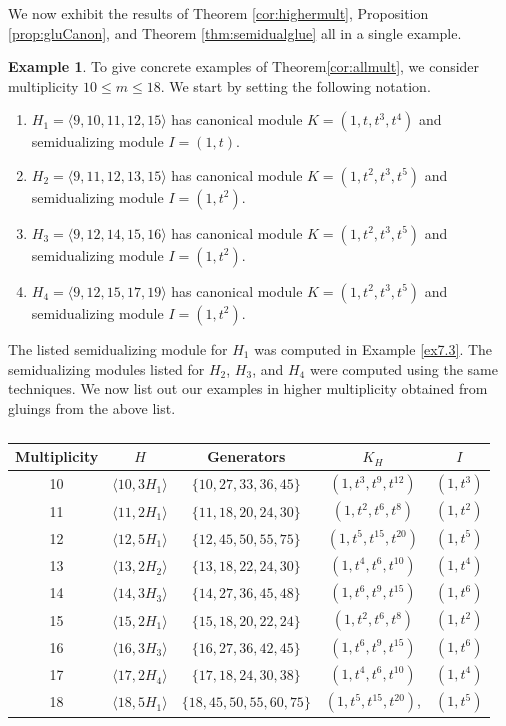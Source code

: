 \documentclass{amsart}
\theoremstyle{plain}
\theoremstyle{definition}
\newtheorem{example}[theorem]{Example}
\numberwithin{theorem}{section}
\numberwithin{equation}{section}
\numberwithin{equation}{theorem}
\begin{document}
We now exhibit the results of Theorem \ref{cor:highermult}, Proposition \ref{prop:gluCanon}, and Theorem \ref{thm:semidualglue} all in a single example.

\begin{example}\label{ex:highmult}
To give concrete examples of Theorem\ref{cor:allmult}, we consider multiplicity $10 \leq m \leq 18$. We start by setting the following notation.
	\begin{enumerate}
		\item $H_1 = \langle 9, 10, 11, 12, 15 \rangle$ has canonical module $K = (1, t, t^3, t^4)$ and semidualizing module $I = (1,t)$.
		\item  $H_2 = \langle 9, 11, 12, 13, 15 \rangle$ has canonical module $K = (1,t^2,t^3,t^5)$ and semidualizing module $I = (1,t^2)$.
		\item $H_3 = \langle 9, 12, 14, 15, 16 \rangle$ has canonical module $K = (1, t^2, t^3, t^5)$ and semidualizing module $I = (1, t^2)$.
		\item $H_4 = \langle 9, 12, 15, 17, 19 \rangle$ has canonical module $K = (1,t^2,t^3,t^5)$ and semidualizing module $I = (1,t^2)$.
	\end{enumerate}
The listed semidualizing module for $H_1$ was computed in Example \ref{ex7.3}. The semidualizing modules listed for $H_2$, $H_3$, and $H_4$ were computed using the same techniques. We now list out our examples in higher multiplicity obtained from gluings from the above list.

\begin{longtable}{|c|c|c|c|c|}
\caption{}
\label{tablemult}
\\
\hline
Multiplicity & $H$ & Generators & $K_H$ & $I$ \\
\hline
10 & $\langle 10, 3H_1 \rangle$ & $\{10,27,33,36,45\}$ & $(1,t^3,t^9,t^{12})$ & $(1,t^3)$ \\
\hline
11 & $\langle 11, 2H_1 \rangle$ & $\{11,18,20,24,30\}$ & $(1,t^2,t^6,t^8)$ & $(1,t^2)$ \\
\hline
12 & $\langle 12, 5H_1 \rangle$ & $\{12,45,50,55,75\}$ & $(1,t^5,t^{15},t^{20})$ & $(1,t^5)$ \\
\hline
13 & $\langle 13, 2H_2\rangle$ & $\{13,18,22,24,30\}$ & $(1,t^4,t^6, t^{10})$ & $(1,t^4)$ \\
\hline
14 & $\langle 14, 3H_3 \rangle$ & $\{14,27,36,45,48\}$ & $(1,t^6,t^9,t^{15})$ & $(1,t^6)$ \\
\hline
15 & $\langle 15, 2H_1\rangle$ & $\{15,18,20,22,24\}$ & $(1,t^2,t^6,t^8)$ & $(1,t^2)$ \\
\hline
16 & $\langle 16, 3H_3 \rangle$ & $\{16,27,36,42,45\}$ & $(1,t^6, t^9, t^{15})$ & $(1,t^6)$ \\
\hline
17 & $\langle 17, 2H_4 \rangle$ & $\{17,18,24,30,38\}$ & $(1,t^4,t^6,t^{10})$ & $(1,t^4)$ \\
\hline
18 & $\langle 18, 5H_1 \rangle$ & $\{18,45,50,55,60,75\}$ & $(1,t^5,t^{15},t^{20})$, & $(1,t^5)$ \\
\hline
\end{longtable}

\end{example}
\end{document}

